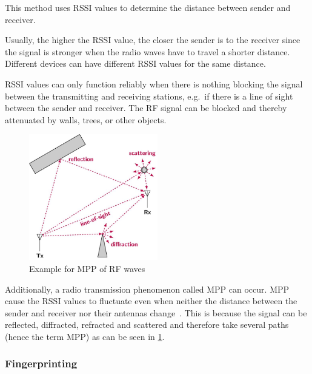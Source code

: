 
This method uses \acf{RSSI} values to determine the distance between sender and receiver.

Usually, the higher the \ac{RSSI} value, the closer the sender is to the receiver since the signal is stronger when the radio waves have to travel a shorter distance.
Different devices can have different \ac{RSSI} values for the same distance.

\ac{RSSI} values can only function reliably when there is nothing blocking the signal between the transmitting and receiving stations, e.g.\ if there is a line of sight between the sender and receiver.
The \ac{RF} signal can be blocked and thereby attenuated by walls, trees, or other objects.

\begin{figure}[h]
    \centering
    \includegraphics[width=0.5\textwidth]{pictures/diagrams_figures/multipath_propagation.jpg}
    \caption{Example for \acf{MPP} of \ac{RF} waves\protect\cite{milosevic_key_2017}}\label{pic:figure_multipath_propagation}
\end{figure}

Additionally, a radio transmission phenomenon called \acf{MPP} can occur.
\acl{MPP} cause the \ac{RSSI} values to fluctuate even when neither the distance between the sender and receiver nor their antennas change~\cite[p. 136]{abdelfadeel_how_2019}.
This is because the signal can be reflected, diffracted, refracted and scattered and therefore take several paths (hence the term \ac{MPP}) as can be seen in \cref{pic:figure_multipath_propagation}.

\subsubsection{Fingerprinting}

